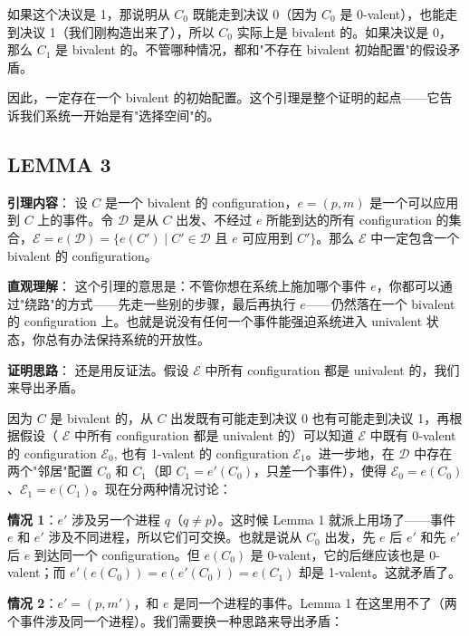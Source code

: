 \documentclass[12pt, a4paper]{ctexart}
\theoremstyle{definition}
\theoremstyle{plain}
\theoremstyle{remark}
\begin{document}
如果这个决议是 1，那说明从 $C_0$ 既能走到决议 0（因为 $C_0$ 是 0-valent），也能走到决议 1（我们刚构造出来了），所以 $C_0$ 实际上是 bivalent 的。如果决议是 0，那么 $C_1$ 是 bivalent 的。不管哪种情况，都和"不存在 bivalent 初始配置"的假设矛盾。

因此，一定存在一个 bivalent 的初始配置。这个引理是整个证明的起点——它告诉我们系统一开始是有"选择空间"的。


\subsection{LEMMA 3}

\textbf{引理内容}：
设 $C$ 是一个 bivalent 的 configuration，$e = (p, m)$ 是一个可以应用到 $C$ 上的事件。令 $\mathcal{D}$ 是从 $C$ 出发、不经过 $e$ 所能到达的所有 configuration 的集合，$\mathcal{E} = e(\mathcal{D}) = \{ e(C') \mid C' \in \mathcal{D} \text{ 且 } e \text{ 可应用到 } C' \}$。那么 $\mathcal{E}$ 中一定包含一个 bivalent 的 configuration。

\textbf{直观理解}：
这个引理的意思是：不管你想在系统上施加哪个事件 $e$，你都可以通过"绕路"的方式——先走一些别的步骤，最后再执行 $e$——仍然落在一个 bivalent 的 configuration 上。也就是说没有任何一个事件能强迫系统进入 univalent 状态，你总有办法保持系统的开放性。

\textbf{证明思路}：
还是用反证法。假设 $\mathcal{E}$ 中所有 configuration 都是 univalent 的，我们来导出矛盾。

因为 $C$ 是 bivalent 的，从 $C$ 出发既有可能走到决议 0 也有可能走到决议 1，再根据假设（ $\mathcal{E}$ 中所有 configuration 都是 univalent 的）可以知道 $\mathcal{E}$ 中既有 0-valent 的 configuration $\mathcal{E}_0$, 也有 1-valent 的 configuration $\mathcal{E}_1$。进一步地，在 $\mathcal{D}$ 中存在两个"邻居"配置 $C_0$ 和 $C_1$（即 $C_1 = e'(C_0)$，只差一个事件），使得 $\mathcal{E}_0 = e(C_0)$、$\mathcal{E}_1 = e(C_1)$。现在分两种情况讨论：

\textbf{情况 1}：$e'$ 涉及另一个进程 $q$（$q \neq p$）。这时候 Lemma 1 就派上用场了——事件 $e$ 和 $e'$ 涉及不同进程，所以它们可交换。也就是说从 $C_0$ 出发，先 $e$ 后 $e'$ 和先 $e'$ 后 $e$ 到达同一个 configuration。但 $e(C_0)$ 是 0-valent，它的后继应该也是 0-valent；而 $e'(e(C_0)) = e(e'(C_0)) = e(C_1)$ 却是 1-valent。这就矛盾了。

\textbf{情况 2}：$e' = (p, m')$，和 $e$ 是同一个进程的事件。Lemma 1 在这里用不了（两个事件涉及同一个进程）。我们需要换一种思路来导出矛盾：
\end{document}
